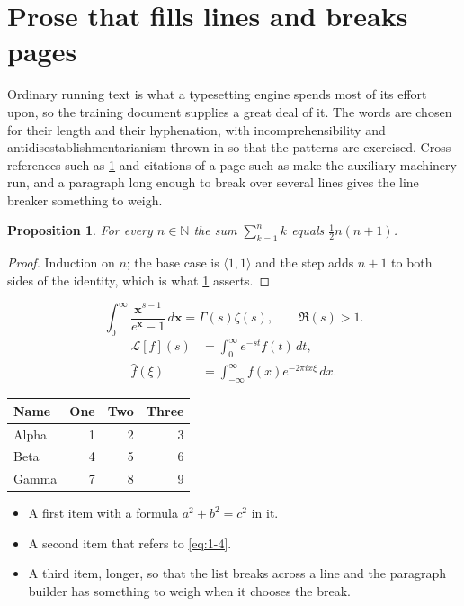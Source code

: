 \documentclass[11pt,a4paper]{report}
\theoremstyle{plain}
\newtheorem{proposition}{Proposition}[chapter]
\newcommand{\vecn}[1]{\mathbf{#1}}
\newcommand{\pairs}[2]{\langle #1,#2\rangle}
\begin{document}
\section{Prose that fills lines and breaks pages}
\label{sec:prose1-4}
Ordinary running text is what a typesetting engine spends most of its effort
upon, so the training document supplies a great deal of it. The words are
chosen for their length and their hyphenation, with incomprehensibility and
antidisestablishmentarianism thrown in so that the patterns are exercised.
Cross references such as \cref{sec:prose1-4} and citations of a page such
as \pageref{sec:prose1-4} make the auxiliary machinery run, and a
paragraph long enough to break over several lines gives the line breaker
something to weigh.
\begin{proposition}\label{prop:1-4}
For every $n\in\mathbb{N}$ the sum $\sum_{k=1}^{n}k$ equals
$\tfrac{1}{2}n(n+1)$.
\end{proposition}
\begin{proof}
Induction on $n$; the base case is $\pairs{1}{1}$ and the step adds $n+1$ to
both sides of the identity, which is what \cref{prop:1-4} asserts.
\end{proof}
\begin{equation}\label{eq:1-4}
  \int_{0}^{\infty}\frac{\vecn{x}^{s-1}}{e^{\vecn{x}}-1}\,d\vecn{x}
    = \Gamma(s)\zeta(s),\qquad \Re(s)>1 .
\end{equation}
\begin{align}
  \mathcal{L}[f](s) &= \int_{0}^{\infty} e^{-st} f(t)\,dt, \\
  \widehat{f}(\xi)  &= \int_{-\infty}^{\infty} f(x) e^{-2\pi i x\xi}\,dx .
\end{align}
\par\noindent\begin{center}
\begin{tabular}{lrrr}
\hline
Name & One & Two & Three \\
\hline
Alpha & 1 & 2 & 3 \\
Beta & 4 & 5 & 6 \\
Gamma & 7 & 8 & 9 \\
\hline
\end{tabular}
\end{center}
\begin{itemize}
  \item A first item with a formula $a^2+b^2=c^2$ in it.
  \item A second item that refers to \eqref{eq:1-4}.
  \item A third item, longer, so that the list breaks across a line and the
    paragraph builder has something to weigh when it chooses the break.
\end{itemize}
\end{document}
